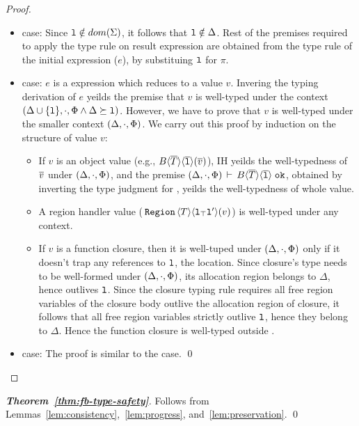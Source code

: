 \begin{proof}
\begin{itemize}
    \item {} case: Since $\mathtt{l} \notin dom(\Sigma)$,
    it follows that $\mathtt{l} \notin \Delta$. Rest of the premises
    required to apply the  type rule on result expression are
    obtained from the  type rule of the initial
    expression ($e$), by substituing $\mathtt{l}$ for $\pi$.

    \item {} case: $e$ is a  expression
    which reduces to a value $v$. Invering the typing derivation of
    $e$ yeilds the premise that $v$ is well-typed under the context
    $(\Delta \cup \{\mathtt{l}\},\cdot,\Phi \wedge \Delta \succeq \mathtt{l})$.
    However, we have to prove that $v$ is well-typed under the smaller
    context $(\Delta,\cdot,\Phi)$. We carry out this proof by
    induction on the structure of value $v$:
    \begin{itemize}
      \item If $v$ is an object value (e.g.,
      $B\langle \overline{T} \rangle\langle \overline{\mathtt{l}} \rangle(\overline{v})$), IH yeilds the
      well-typedness of $\overline{v}$ under $(\Delta,\cdot,\Phi)$, and the
      premise 
      $(\Delta,\cdot,\Phi)\,\vdash\,B\langle \overline{T} \rangle\langle \overline{\mathtt{l}} \rangle \; \texttt{ok}$,
      obtained by inverting the type judgment for , yeilds the
      well-typedness of whole value.

      \item A region handler value ($\,{\tt Region}\,\langle T \rangle\langle \mathtt{l}_{\top}\mathtt{l}' \rangle(v)$) is
      well-typed under any context.

      \item If $v$ is a function closure, then it is well-tuped under
      $(\Delta,\cdot,\Phi)$ only if it doesn't trap any references
      to $\mathtt{l}$, the  location. Since closure's type needs to
      be well-formed under $(\Delta,\cdot,\Phi)$, its allocation
      region belongs to $\Delta$, hence outlives $\mathtt{l}$. Since the
      closure typing rule requires all free region variables of the
      closure body outlive the allocation region of closure, it
      follows that all free region variables strictly outlive $\mathtt{l}$,
      hence they belong to $\Delta$. Hence the function closure is
      well-typed outside .
    \end{itemize}

  \item {} case: The proof is similar to the 
  case.
  \qed
  \end{itemize}
\end{proof}

\begin{proof}[\textbf{Theorem~\ref{thm:fb-type-safety}}]
Follows from Lemmas~\ref{lem:consistency},~\ref{lem:progress},
and~\ref{lem:preservation}.
\qed
\end{proof}
